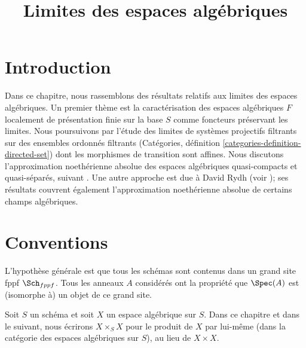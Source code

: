 

%


\title{Limites des espaces algébriques}


\maketitle

\label{section-phantom}

\tableofcontents

\section{Introduction}
\label{section-introduction}

\noindent
Dans ce chapitre, nous rassemblons des résultats relatifs aux limites des espaces algébriques.
Un premier thème est la caractérisation des espaces algébriques $F$ localement
de présentation finie sur la base $S$ comme foncteurs préservant les limites.
Nous poursuivons par l'étude des limites de systèmes projectifs filtrants sur des
ensembles ordonnés filtrants (Catégories, définition \ref{categories-definition-directed-set})
dont les morphismes de transition sont affines. Nous discutons l'approximation
noethérienne absolue des espaces algébriques quasi-compacts et quasi-séparés,
suivant \cite{CLO}. Une autre approche est due à David Rydh (voir
\cite{rydh_approx}); ses résultats couvrent également l'approximation noethérienne
absolue de certains champs algébriques.


\section{Conventions}
\label{section-conventions}

\noindent
L'hypothèse générale est que tous les schémas sont contenus dans
un grand site fppf $\Sch_{fppf}$. Tous les anneaux $A$ considérés
ont la propriété que $\Spec(A)$ est (isomorphe à) un
objet de ce grand site.

\medskip\noindent
Soit $S$ un schéma et soit $X$ un espace algébrique sur $S$.
Dans ce chapitre et dans le suivant, nous écrirons $X \times_S X$
pour le produit de $X$ par lui-même (dans la catégorie des espaces algébriques
sur $S$), au lieu de $X \times X$.












